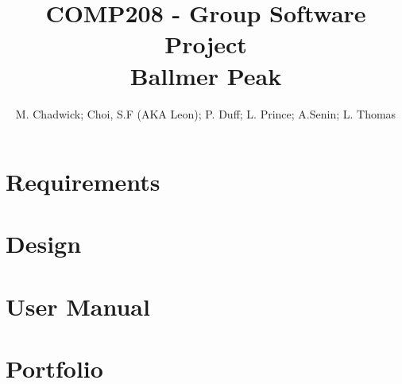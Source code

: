 \documentclass[openany]{book}
\title{COMP208 - Group Software Project\\Ballmer Peak}
\author{M. Chadwick; Choi, S.F (AKA Leon); P. Duff; L. Prince; A.Senin; L. Thomas}
\begin{document}
\maketitle
\tableofcontents

\part{Requirements}


\part{Design}


\part{User Manual}


\part{Portfolio}

\end{document}
